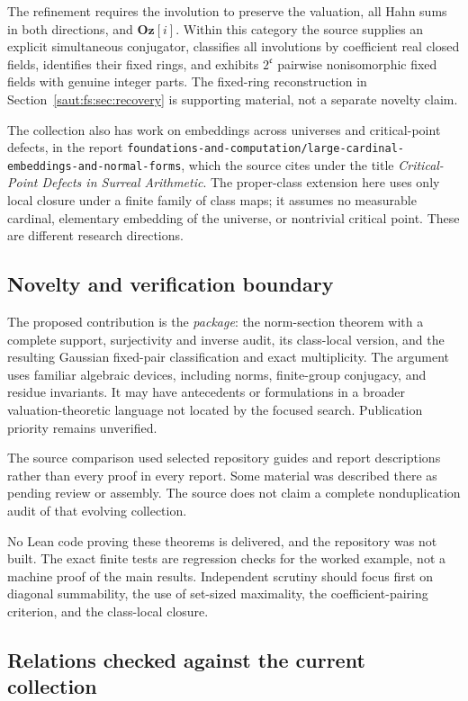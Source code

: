 \documentclass[11pt]{article}
\theoremstyle{definition}
\theoremstyle{remark}
\newcommand{\repo}[1]{\nolinkurl{#1}}%
\newcommand{\Oz}{\mathbf{Oz}}
\newcommand{\cc}{\mathfrak c}
\numberwithin{equation}{section}
\begin{document}
The refinement requires the involution to preserve the valuation, all Hahn sums in
both directions, and $\Oz[i]$. Within this category the source supplies an explicit
simultaneous conjugator, classifies all involutions by coefficient real closed
fields, identifies their fixed rings, and exhibits $2^{\cc}$ pairwise nonisomorphic
fixed fields with genuine integer parts. The fixed-ring reconstruction in
Section~\ref{saut:fs:sec:recovery} is supporting material, not a separate novelty
claim.

The collection also has work on embeddings across universes and critical-point
defects, in the report
\repo{foundations-and-computation/large-cardinal-embeddings-and-normal-forms}, which
the source cites under the title \emph{Critical-Point Defects in Surreal
Arithmetic}. The proper-class extension here uses only local closure under a finite
family of class maps; it assumes no measurable cardinal, elementary embedding of the
universe, or nontrivial critical point. These are different research directions.

\subsection{Novelty and verification boundary}

The proposed contribution is the \emph{package}: the norm-section theorem with a
complete support, surjectivity and inverse audit, its class-local version, and the
resulting Gaussian fixed-pair classification and exact multiplicity. The argument uses
familiar algebraic devices, including norms, finite-group conjugacy, and residue
invariants. It may have antecedents or formulations in a broader valuation-theoretic
language not located by the focused search. Publication priority remains unverified.

The source comparison used selected repository guides and report descriptions rather
than every proof in every report. Some material was described there as pending review
or assembly. The source does not claim a complete nonduplication audit of that
evolving collection.

No Lean code proving these theorems is delivered, and the repository was not built.
The exact finite tests are regression checks for the worked example, not a machine
proof of the main results. Independent scrutiny should focus first on diagonal
summability, the use of set-sized maximality, the coefficient-pairing criterion, and
the class-local closure.

\subsection{Relations checked against the current collection}\label{saut:fs:sec:relations}
\end{document}
